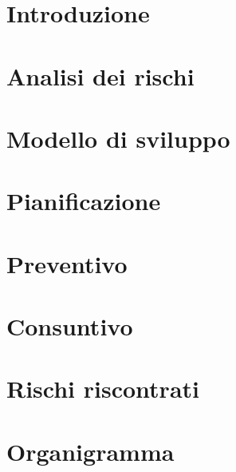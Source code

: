 \documentclass{article}
\begin{document}


\section{Introduzione}
\label{sec:introduzione}


\newpage
\section{Analisi dei rischi}
\label{sec:rischi}


\newpage
\section{Modello di sviluppo}
\label{sec:sviluppo}


\newpage
\section{Pianificazione}
\label{sec:pianif}


\newpage
\section{Preventivo}
\label{sec:prev}


\newpage
\section{Consuntivo}
\label{sec:cons}


\newpage
\appendix
\section{Rischi riscontrati}
\label{sec:rischi_risc}


\newpage
\section{Organigramma}
\label{sec:org}

\end{document}
